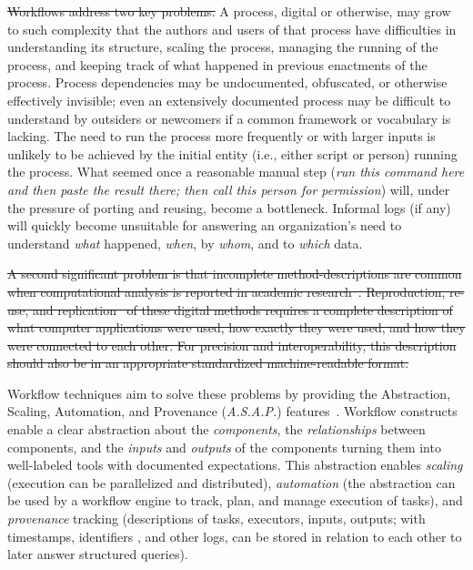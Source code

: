 \documentclass[sigconf,revew,screen,timestamp,nonacm]{acmart}
\newcommand{\addition}[1]{{\color{brown} #1}}
\newcommand{\deletion}[1]{{\color{red} \sout{#1}}}
\newcommand{\todortwo}[1]{\todo[linecolor=white,color=KamPurple!40]{R2.#1}}
\begin{document}
\deletion{Workflows address two key problems.} A process, digital or otherwise, may grow to such complexity that the authors and users of that process have difficulties in understanding its structure, scaling the process, managing the running of the process, and keeping track of what happened in previous enactments of the process. Process dependencies may be undocumented, obfuscated, or otherwise effectively invisible; even an extensively documented process may be difficult to understand by outsiders or newcomers if a common framework or vocabulary is lacking. The need to run the process more frequently or with larger inputs is unlikely to be achieved  by the initial entity (i.e., either script or person) running the process. What seemed once a reasonable manual step (\textit{run this command here and then paste the result there; then call this person for permission}) will, under the pressure of porting and reusing, become a bottleneck. Informal logs (if any) will quickly become unsuitable for answering an organization's need to understand \textit{what} happened, \textit{when}, by \textit{whom}, and to \textit{which} data.

\deletion{A second significant problem is that incomplete method-descriptions are common when computational analysis is reported in academic research~\cite{ivie_reproducibility_2018}. Reproduction, re-use, and replication~\cite{feitelson_repeatability_2015} of these digital methods requires a complete description of what computer applications were used, how exactly they were used, and how they were connected to each other. For precision and interoperability, this description should also be in an appropriate standardized machine-readable format.}

Workflow techniques aim to solve these problems by providing the Abstraction, Scaling, Automation, and Provenance (\textit{A.S.A.P.}) features~\cite{cuevas-vicenttin_scientific_2012}.  Workflow constructs enable a clear abstraction about the \textit{components}, the \textit{relationships} between components, and the \textit{inputs} and \textit{outputs} of the components turning them into well-labeled tools with documented expectations. This abstraction enables \textit{scaling} (execution can be parallelized and distributed), \textit{automation} (the abstraction can be used by a workflow engine to track, plan, and manage execution of tasks), and \textit{provenance} tracking (descriptions of tasks, executors, inputs, outputs; with timestamps, identifiers \todortwo{19}\addition{(\textit{unique names})}, and other logs, can be stored in relation to each other to later answer structured queries).
\end{document}
